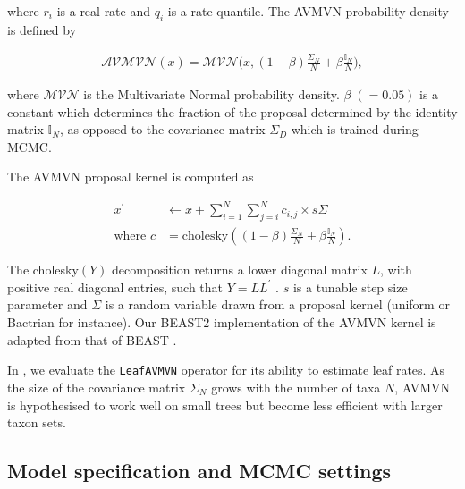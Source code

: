 \documentclass[10pt,letterpaper]{article}
\begin{document}
where $r_i$ is a real rate and $q_i$ is a rate quantile. The AVMVN probability density is defined by 


\begin{align}
	\mathcal{AVMVN}(x) =  \mathcal{MVN}\big(x, (1-\beta) \frac{\Sigma_N}{N} + \beta \frac{\mathbb{I}_N}{N} \big) ,
\end{align}


where $\mathcal{MVN}$ is the Multivariate Normal probability density. $\beta \; (= 0.05)$ is a constant which determines the fraction of the proposal determined by the identity matrix $\mathbb{I}_N$, as opposed to the covariance matrix $\Sigma_D$ which is trained during MCMC.

The AVMVN proposal kernel is computed as


\begin{align}
	x^\prime &\leftarrow x + \sum\limits_{i=1}^N \sum\limits_{j=i}^N c_{i,j} \times s\Sigma \\
	\text {where }  c &= \text{cholesky} \left( (1-\beta) \frac{\Sigma_N}{N} + \beta \frac{\mathbb{I}_N}{N} \right).
\end{align}


The cholesky$(Y)$ decomposition returns a lower diagonal matrix $L$, with positive real diagonal entries, such that $Y = LL^\prime$ \cite{lindstrom1988newton, pourahmadi2007cholesky}. $s$ is a tunable step size parameter and $\Sigma$ is a random variable drawn from a proposal kernel (uniform or Bactrian for instance). Our BEAST2 implementation of the AVMVN kernel is adapted from that of BEAST \cite{suchard2018bayesian}.



In , we evaluate the \texttt{LeafAVMVN} operator for its ability to estimate leaf rates. 
As the size of the covariance matrix $\Sigma_N$ grows with the number of taxa $N$, AVMVN is hypothesised to work well on small trees but become less efficient with larger taxon sets.







\clearpage
\subsection*{Model specification and MCMC settings} \label{sect:methods}
\end{document}
